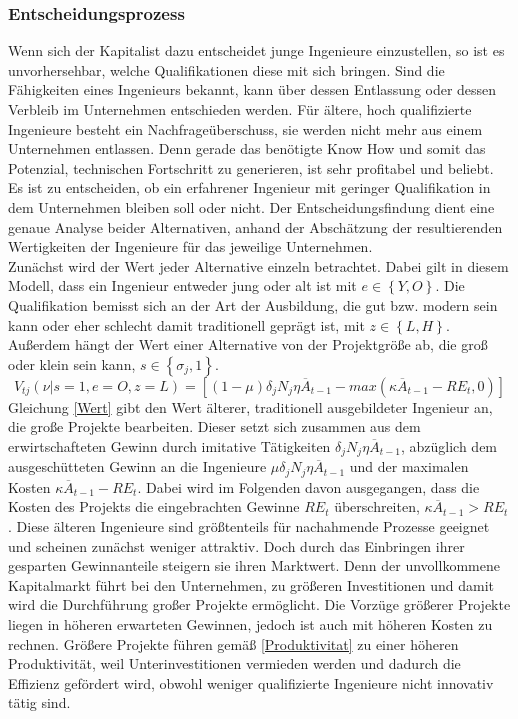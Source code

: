 \subsubsection{Entscheidungsprozess}
Wenn sich der Kapitalist dazu entscheidet junge Ingenieure einzustellen, so ist es unvorhersehbar, welche Qualifikationen diese mit sich bringen. Sind die Fähigkeiten eines Ingenieurs bekannt, kann über dessen Entlassung oder dessen Verbleib im Unternehmen entschieden werden. Für ältere, hoch qualifizierte Ingenieure besteht ein Nachfrageüberschuss, sie werden nicht mehr aus einem Unternehmen entlassen. Denn gerade das benötigte Know How und somit das Potenzial, technischen Fortschritt zu generieren, ist sehr profitabel und beliebt. Es ist zu entscheiden, ob ein erfahrener Ingenieur mit geringer Qualifikation in dem Unternehmen bleiben soll oder nicht. Der Entscheidungsfindung dient eine genaue Analyse beider Alternativen, anhand der Abschätzung der resultierenden Wertigkeiten der Ingenieure für das jeweilige  Unternehmen.\\
%
Zunächst wird der Wert jeder Alternative einzeln betrachtet. Dabei gilt in diesem Modell, dass ein Ingenieur entweder jung oder alt ist mit $e\in\left\{Y,O\right\}$. Die Qualifikation bemisst sich an der Art der Ausbildung, die gut bzw. modern sein kann oder eher schlecht damit traditionell geprägt ist, mit $z\in\left\{L,H\right\}$. Außerdem hängt der Wert einer Alternative von der Projektgröße ab, die groß oder klein sein kann, $s\in\left\{\sigma_j,1\right\}$.
%
	\begin{equation}
		V_{tj} (\nu|s=1,e=O,z=L)=[(1-\mu)\delta_j N_j \eta\overline{A}_{t-1}-max(\kappa\overline{A}_{t-1}-RE_t,0)]\label{Wert}
	\end{equation}
%
Gleichung \eqref{Wert} gibt den Wert älterer, traditionell ausgebildeter Ingenieur an, die große Projekte bearbeiten. Dieser setzt sich zusammen aus dem erwirtschafteten Gewinn durch imitative Tätigkeiten $\delta_j N_j \eta\overline{A}_{t-1}$, abzüglich dem ausgeschütteten Gewinn an die Ingenieure $\mu\delta_j N_j \eta\overline{A}_{t-1}$ und der maximalen Kosten $\kappa\overline{A}_{t-1}-RE_t$. Dabei wird im Folgenden davon ausgegangen, dass die Kosten des Projekts die eingebrachten Gewinne $RE_t$ überschreiten, $\kappa\overline{A}_{t-1}>RE_t$. Diese älteren Ingenieure sind größtenteils für nachahmende Prozesse geeignet und scheinen zunächst weniger attraktiv. Doch durch das Einbringen ihrer gesparten Gewinnanteile steigern sie ihren Marktwert. Denn der unvollkommene Kapitalmarkt führt bei den Unternehmen, zu größeren Investitionen und damit wird die Durchführung großer Projekte ermöglicht. Die Vorzüge größerer Projekte liegen in höheren erwarteten Gewinnen, jedoch ist auch mit höheren Kosten zu rechnen. Größere Projekte führen gemäß \eqref{Produktivitat} zu einer höheren Produktivität, weil Unterinvestitionen vermieden werden und dadurch die Effizienz gefördert wird, obwohl weniger qualifizierte Ingenieure nicht innovativ tätig sind. 
